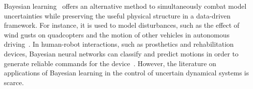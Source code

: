 Bayesian learning~\cite{gal2016improving,thakur} offers an alternative method to
simultaneously combat model uncertainties while preserving the useful physical
structure in a data-driven framework.
%
%
For instance, it is used to model disturbances, such as the effect of wind gusts
on quadcopters and the motion of other vehicles in autonomous
driving~\cite{sadigh2015safe}. 
%
%
%
In human-robot interactions, such as prosthetics and rehabilitation devices,
Bayesian neural networks can classify and predict motions in order to generate
reliable commands for the device~\cite{motionclassification}. 
%
%
%
However, the literature on applications of Bayesian learning in the control of
uncertain dynamical systems is scarce.

    


